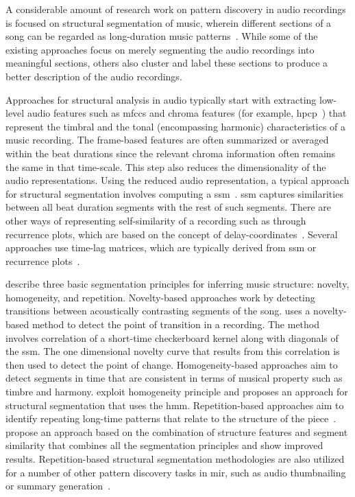 A considerable amount of research work on pattern discovery in audio recordings is focused on structural segmentation of music, wherein different sections of a song can be regarded as long-duration music patterns~\citep{paulus2010state}. While some of the existing approaches focus on merely segmenting the audio recordings into meaningful sections, others also cluster and label these sections to produce a better description of the audio recordings. 

Approaches for structural analysis in audio typically start with extracting low-level audio features such as \glspl{mfcc} and chroma features (for example, \gls{hpcp}~\citep{gomez2006tonal}) that represent the timbral and the tonal (encompassing harmonic) characteristics of a music recording. The frame-based features are often summarized or averaged within the beat durations since the relevant chroma information often remains the same in that time-scale. This step also reduces the dimensionality of the audio representations. Using the reduced audio representation, a typical approach for structural segmentation involves computing a \gls{ssm}~\citep{foote2000automatic}. \Gls{ssm} captures similarities between all beat duration segments with the rest of such segments. There are other ways of representing self-similarity of a recording such as through recurrence plots, which are based on the concept of delay-coordinates~\citep{serra2014unsupervised}. Several approaches use time-lag matrices, which are typically derived from \gls{ssm} or recurrence plots~\citep{Goto06TASLP}.

\cite{paulus2010state} describe three basic segmentation principles for inferring music structure: novelty, homogeneity, and repetition. Novelty-based approaches work by detecting transitions between acoustically contrasting segments of the song. \cite{foote2000automatic} uses a novelty-based method to detect the point of transition in a recording. The method involves correlation of a short-time checkerboard kernel along with diagonals of the \gls{ssm}. The one dimensional novelty curve that results from this correlation is then used to detect the point of change. Homogeneity-based approaches aim to detect segments in time that are consistent in terms of musical property such as timbre and harmony. \cite{levy2008structural} exploit homogeneity principle and proposes an approach for structural segmentation that uses the \acrfull{hmm}. Repetition-based approaches aim to identify repeating long-time patterns that relate to the structure of the piece~\citep{Goto06TASLP,dannenberg2003pattern,muller2006towards}. \cite{serra2014unsupervised} propose an approach based on the combination of structure features and segment similarity that combines all the segmentation principles and show improved results. Repetition-based structural segmentation methodologies are also utilized for a number of other pattern discovery tasks in \gls{mir}, such as audio thumbnailing or summary generation~\citep{chai2003music,aucouturier2002finding,muller2013robust,nieto2012compressing}. 

